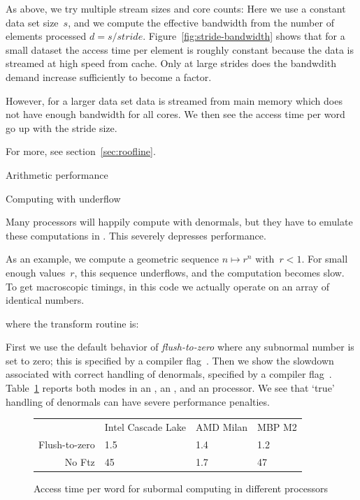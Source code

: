 As above, we try multiple stream sizes and core counts:
%
%
Here we use a constant data set size~$s$, and we compute the effective bandwidth
from the number of elements processed $d=s/\mathit{stride}$.
Figure~\ref{fig:stride-bandwidth} shows that for a small dataset
the access time per element is roughly constant
because the data is streamed at high speed from cache.
Only at large strides does the bandwdith demand increase
sufficiently to become a factor.

However, for a larger data set data is streamed from main memory
which does not have enough bandwidth for all cores.
We then see the access time per word go up with the stride size.


For more, see section~\ref{sec:roofline}.

 {Arithmetic performance}


 {Computing with underflow}
\label{sec:subcompute}

Many processors will happily compute with
  denormals,
but they have to emulate these computations in .
This severely depresses performance.

As an example, we compute a geometric sequence $n\mapsto r^n$ with~$r<1$.
For small enough values~$r$, this sequence underflows, and the computation becomes slow.
To get macroscopic timings, in this code we actually operate on an array
of identical numbers.


where the transform routine is:


First we use the default behavior of
\emph{flush-to-zero} where
any subnormal number is set to zero;
this is specified by a compiler flag~.
Then we show the slowdown associated with correct handling
of denormals, specified by a compiler flag~.
Table~\ref{fig:perf-underflow} reports both modes
in an , an ,
and an  processor.
We see that `true' handling of denormals can have severe performance penalties.

\begin{figure}
  \begin{tabular}{rp{1.2in}p{1.2in}p{1.2in}}
                 &Intel Cascade Lake&AMD Milan&MBP M2\\
    Flush-to-zero&1.5               &1.4      &1.2\\
    No Ftz       &45                &1.7      &47\\
  \end{tabular}
  \caption{Access time per word for subormal computing in different processors}
  \label{fig:perf-underflow}
\end{figure}

